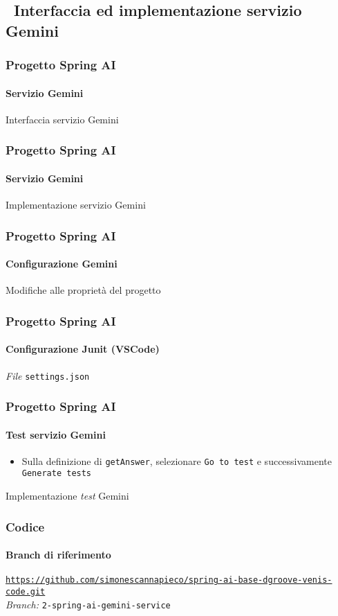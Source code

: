 \subsection{\faWrench\ Interfaccia ed implementazione servizio Gemini} %
\label{subsec:spring-ai-gemini-service-code}
%
\begin{frame}[t,fragile] \frametitle{Progetto Spring AI}
    \framesubtitle{Servizio Gemini}
        \begin{block}{Interfaccia servizio Gemini}
{\tiny}
    \end{block}
\end{frame}
%
\begin{frame}[t,fragile] \frametitle{Progetto Spring AI}
    \framesubtitle{Servizio Gemini}
        \begin{block}{Implementazione servizio Gemini}
{\tiny}
    \end{block}
\end{frame}
%
\begin{frame}[t,fragile] \frametitle{Progetto Spring AI}
    \framesubtitle{Configurazione Gemini}
        \begin{block}{Modifiche alle proprietà del progetto}
{\tiny}
    \end{block}
\end{frame}
%
\begin{frame}[t,fragile] \frametitle{Progetto Spring AI}
    \framesubtitle{Configurazione Junit (VSCode)}
        \begin{block}{\textit{File} \texttt{settings.json}}
{\tiny}
    \end{block}
\end{frame}
%
\begin{frame}[t,fragile] \frametitle{Progetto Spring AI}
    \framesubtitle{Test servizio Gemini}
    \begin{itemize}
        \item[\alertedcircled{1}] Sulla definizione di \texttt{getAnswer}, selezionare \texttt{Go to test} e successivamente \texttt{Generate tests}
    \end{itemize}
        \begin{block}{Implementazione \textit{test} Gemini}
{\tiny}
    \end{block}
\end{frame}
%
\begin{frame}[fragile] \frametitle{Codice}
    \framesubtitle{Branch di riferimento}
	\begin{center}
		{\scriptsize \href{https://github.com/simonescannapieco/spring-ai-base-dgroove-venis-code.git}{\texttt{https://github.com/simonescannapieco/spring-ai-base-dgroove-venis-code.git}}}\\
		\textit{Branch:} \alert{\texttt{2-spring-ai-gemini-service}}
	\end{center}
\end{frame}